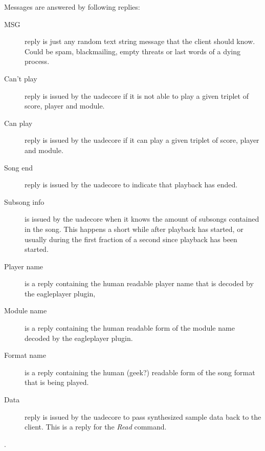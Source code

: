 \documentclass{article}
\begin{document}
Messages are answered by following replies:
\begin{description}
\item [MSG] reply is just any random text string message that the client should
know. Could be spam, blackmailing, empty threats or last words of a dying
process.
\item [Can't play] reply is issued by the uadecore if it is not able to play
a given triplet of score, player and module.
\item [Can play] reply is issued by the uadecore if it can play a given
triplet of score, player and module.
\item [Song end] reply is issued by the uadecore to indicate that playback
has ended.
\item [Subsong info] is issued by the uadecore when it knows the amount of
subsongs contained in the song. This happens a short while after playback
has started, or usually during the first fraction of a second since
playback has been started.
\item [Player name] is a reply containing the human readable player name
that is decoded by the eagleplayer plugin,
\item [Module name] is a reply containing the human readable form of the
module name decoded by the eagleplayer plugin.
\item [Format name] is a reply containing the human (geek?) readable form
of the song format that is being played.
\item [Data] reply is issued by the uadecore to pass synthesized sample
data back to the client. This is a reply for the \emph{Read} command.
\end{description}.
\end{document}
